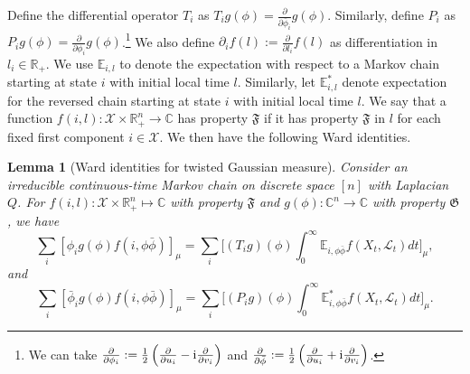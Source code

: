 \documentclass[a4paper, 11pt]{article}
\newcommand{\E}{\mathbb{E}}
\newcommand{\Ell}{\mathcal{L}}
\newcommand{\compi}{\textnormal{i}}
\newtheorem{lem}[thm]{Lemma}
\begin{document}
Define the differential operator $T_i$ as $T_ig(\phi)=\frac{\partial }{\partial \bar{\phi}_i}g(\phi)$. Similarly, define $P_i$ as $P_ig(\phi)=\frac{\partial}{\partial \phi_i}g(\phi)$.\footnote{We can take $\frac{\partial}{\partial \phi_i}:=\frac{1}{2} \left( \frac{\partial}{\partial u_i}-\compi \frac{\partial}{\partial v_i}\right)$ and $\frac{\partial}{\partial \bar{\phi}}:=
\frac{1}{2} \left( \frac{\partial}{\partial u_i}+\compi \frac{\partial}{\partial v_i} \right)$.} We also define $\partial_i f(l):=\frac{\partial}{\partial l_i}f(l)$ as differentiation in $l_i\in\mathbb{R}_+$. We use $\E_{i,l}$ to denote the expectation with respect to a Markov chain starting at state $i$ with initial local time $l$. Similarly, let $\E_{i,l}^*$ denote expectation for the reversed chain starting at state $i$ with initial local time $l$. We say that a function $f(i,l):\mathcal{X}\times \mathbb{R}_+^n\rightarrow \mathbb{C}$ has property $\mathfrak{F}$ if it has property $\mathfrak{F}$ in $l$ for each fixed first component $i\in\mathcal{X}$. We then have the following Ward identities.

\vspace{.3em} \begin{lem}[Ward identities for twisted Gaussian measure]
\label{lem:ward}
Consider an irreducible continuous-time Markov chain on discrete space $[n]$ with Laplacian $Q$. For $f(i,l):\mathcal{X}\times \mathbb{R}_+^n\mapsto \mathbb{C}$ with property $\mathfrak{F}$ and $g(\phi):\mathbb{C}^n\rightarrow\mathbb{C}$ with property $\mathfrak{G}$, we have
\[\sum_i[ \phi_i g(\phi) f(i,\phi\bar{\phi}) ]_\mu=\sum_i\bigg[ (T_ig)(\phi)\int_0^\infty \E_{i,\phi\bar{\phi}}f(X_t, \Ell_t)dt\bigg]_\mu,\]
and
\[\sum_i[ \bar{\phi}_i g(\phi) f(i,\phi\bar{\phi})]_\mu=\sum_i\bigg[ (P_ig)(\phi)\int_0^\infty \E_{i,\phi\bar{\phi}}^*f(X_t, \Ell_t)dt\bigg]_\mu.\]
\end{lem}
\end{document}
